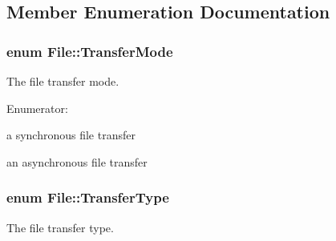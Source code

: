 \subsection{Member Enumeration Documentation}
\hypertarget{classFile_a4295512b0ee27752fb5ee313155499cc}{
\subsubsection[{TransferMode}]{\setlength{\rightskip}{0pt plus 5cm}enum {\bf File::TransferMode}}}
\label{classFile_a4295512b0ee27752fb5ee313155499cc}


The file transfer mode. 

\begin{Desc}
\item[Enumerator: ]\par
\begin{description}
\item[{\em 
\hypertarget{classFile_a4295512b0ee27752fb5ee313155499cca8c6ef20805ae2b316a75d1e6921c01b8}{
sync}
\label{classFile_a4295512b0ee27752fb5ee313155499cca8c6ef20805ae2b316a75d1e6921c01b8}
}]a synchronous file transfer \item[{\em 
\hypertarget{classFile_a4295512b0ee27752fb5ee313155499ccaad05772127fa058068c3ec4574cbd180}{
async}
\label{classFile_a4295512b0ee27752fb5ee313155499ccaad05772127fa058068c3ec4574cbd180}
}]an asynchronous file transfer \end{description}
\end{Desc}

\hypertarget{classFile_a6b5e0e4ca04b9983349e02866ff1c659}{
\subsubsection[{TransferType}]{\setlength{\rightskip}{0pt plus 5cm}enum {\bf File::TransferType}}}
\label{classFile_a6b5e0e4ca04b9983349e02866ff1c659}


The file transfer type. 

